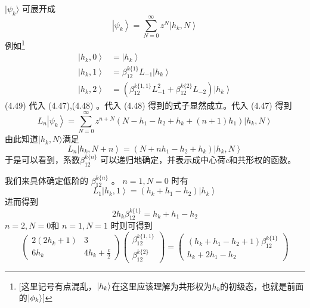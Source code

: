 $|\psi_k\rangle$ 可展开成
\begin{equation}
	\left|\psi_{k}\right\rangle=\sum_{N=0}^{\infty} z^{N}\left|h_{k}, N\right\rangle
\end{equation}
例如\footnote{[这里记号有点混乱，$\ket{h_k}$在这里应该理解为共形权为$h_k$的初级态，也就是前面的$\ket{\phi_k}$]}
\begin{align} \left|h_{k}, 0\right\rangle &=\left|h_{k}\right\rangle \\ \left|h_{k}, 1\right\rangle &=\beta_{12}^{k\{1\}} L_{-1}\left|h_{k}\right\rangle \\ \left|h_{k}, 2\right\rangle &=\left(\beta_{12}^{k\{1,1\}} L_{-1}^{2}+\beta_{12}^{k\{2\}} L_{-2}\right)\left|h_{k}\right\rangle  \end{align}
(4.49) 代入 (4.47),(4.48) 。代入 (4.48) 得到的式子显然成立。代入 (4.47) 得到
\begin{equation}
	L_{n}\left|\psi_{k}\right\rangle=\sum_{N=0}^{\infty} z^{n+N}\left(N-h_{1}-h_{2}+h_{k}+(n+1) h_{1}\right)\left|h_{k}, N\right\rangle
\end{equation}
由此知道$ |h_k,N\rangle $满足
\begin{equation}
	L_{n}\left|h_{k}, N+n\right\rangle=\left(N+n h_{1}-h_{2}+h_{k}\right)\left|h_{k}, N\right\rangle
\end{equation}
于是可以看到，系数$ \beta_{12}^{k\{n\}}$ 可以递归地确定，并表示成中心荷$ c $和共形权的函数。

我们来具体确定低阶的 $\beta_{12}^{k\{n\}}$ 。 $n=1,N=0$ 时有
\begin{equation}
L_{1}\left|h_{k}, 1\right\rangle=\left(h_{k}+h_{1}-h_{2}\right)\left|h_{k}\right\rangle 
\end{equation}
进而得到
\begin{equation}
	2 h_{k} \beta_{12}^{k\{1\}}=h_{k}+h_{1}-h_{2}
\end{equation}
$n=2,N=0 $和 $n=1,N=1$ 时则可得到
\begin{equation}
\left(\begin{array}{cc} 2\left(2 h_{k}+1\right) & 3 \\ 6 h_{k} & 4 h_{k}+\frac{c}{2} \end{array}\right)\left(\begin{array}{c} \beta_{12}^{k\{1,1\}} \\ \beta_{12}^{k\{2\}} \end{array}\right)=\left(\begin{array}{c} \left(h_{k}+h_{1}-h_{2}+1\right) \beta_{12}^{k\{1\}} \\ h_{k}+2 h_{1}-h_{2} \end{array}\right)
\end{equation}

